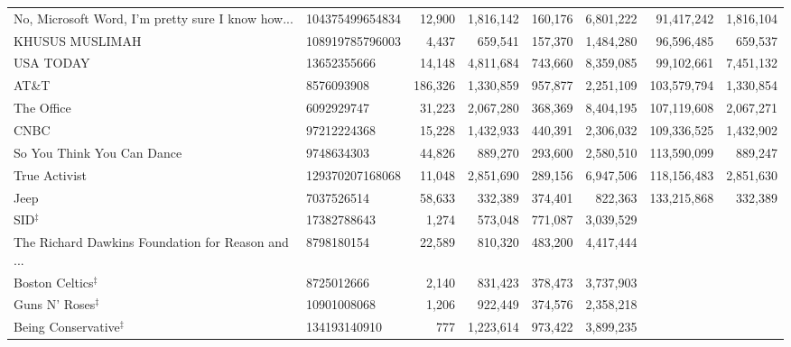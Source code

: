 \begin{longtable}{llrrrrrr}
 No, Microsoft Word, I'm pretty sure I know how... &  104375499654834 &  12,900 &   1,816,142 &    160,176 &   6,801,222 &  91,417,242 & 1,816,104 \\
                                   KHUSUS MUSLIMAH &  108919785796003 &   4,437 &     659,541 &    157,370 &   1,484,280 &  96,596,485 &   659,537 \\
                                         USA TODAY &      13652355666 &  14,148 &   4,811,684 &    743,660 &   8,359,085 &  99,102,661 & 7,451,132 \\
                                             AT\&T &       8576093908 & 186,326 &   1,330,859 &    957,877 &   2,251,109 & 103,579,794 & 1,330,854 \\
                                        The Office &       6092929747 &  31,223 &   2,067,280 &    368,369 &   8,404,195 & 107,119,608 & 2,067,271 \\
                                              CNBC &      97212224368 &  15,228 &   1,432,933 &    440,391 &   2,306,032 & 109,336,525 & 1,432,902 \\
                        So You Think You Can Dance &       9748634303 &  44,826 &     889,270 &    293,600 &   2,580,510 & 113,590,099 &   889,247 \\
                                     True Activist &  129370207168068 &  11,048 &   2,851,690 &    289,156 &   6,947,506 & 118,156,483 & 2,851,630 \\
                                              Jeep &       7037526514 &  58,633 &     332,389 &    374,401 &     822,363 & 133,215,868 &   332,389 \\
                                    SID$^\ddagger$ &      17382788643 &   1,274 &     573,048 &    771,087 &   3,039,529 &             &           \\
 The Richard Dawkins Foundation for Reason and ... &       8798180154 &  22,589 &     810,320 &    483,200 &   4,417,444 &             &           \\
                         Boston Celtics$^\ddagger$ &       8725012666 &   2,140 &     831,423 &    378,473 &   3,737,903 &             &           \\
                          Guns N' Roses$^\ddagger$ &      10901008068 &   1,206 &     922,449 &    374,576 &   2,358,218 &             &           \\
                     Being Conservative$^\ddagger$ &     134193140910 &     777 &   1,223,614 &    973,422 &   3,899,235 &             &           \\

\end{longtable}
